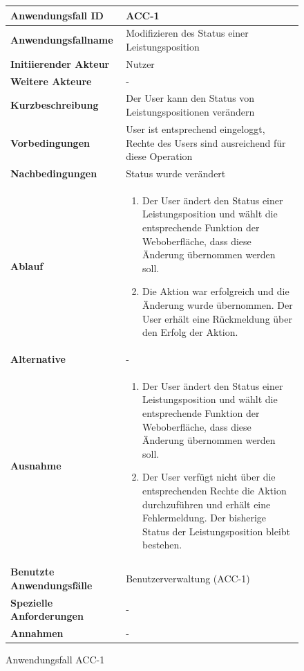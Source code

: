 \begin{figure}[h]
	\centering
	\begin{tabularx}{\textwidth}{ X | X }
		\textbf{Anwendungsfall ID} & ACC-1 \\ \hline
		\textbf{Anwendungsfallname} & Modifizieren des Status einer Leistungsposition \\ \hline
		\textbf{Initiierender Akteur} & Nutzer \\ \hline
		\textbf{Weitere Akteure} & -  \\ \hline
		\textbf{Kurzbeschreibung} & Der User kann den Status von Leistungspositionen ver\"andern \\ \hline
		\textbf{Vorbedingungen} & User ist entsprechend eingeloggt, Rechte des Users sind ausreichend f\"ur diese Operation \\ \hline
		\textbf{Nachbedingungen} & Status wurde ver\"andert \\ \hline
		\textbf{Ablauf} &
		\begin{enumerate}
			\item Der User \"andert den Status einer Leistungsposition und w\"ahlt die entsprechende Funktion der Weboberfl\"ache, dass diese \"Anderung \"ubernommen werden soll.
			\item Die Aktion war erfolgreich und die \"Anderung wurde \"ubernommen.  Der User erh\"alt eine R\"uckmeldung \"uber den Erfolg der Aktion.
		\end{enumerate} \\ \hline
		\textbf{Alternative} & -
		\\ \hline
		\textbf{Ausnahme} &
		\begin{enumerate}
			\item Der User \"andert den Status einer Leistungsposition und w\"ahlt die entsprechende Funktion der Weboberfl\"ache,  dass diese \"Anderung \"ubernommen werden soll.
			\item Der User verf\"ugt nicht \"uber die entsprechenden Rechte die Aktion durchzuf\"uhren und erh\"alt eine Fehlermeldung. Der bisherige Status der Leistungsposition bleibt bestehen.
		\end{enumerate}  \\ \hline
		\textbf{Benutzte Anwendungsfälle} & Benutzerverwaltung (ACC-1) \\ \hline
		\textbf{Spezielle Anforderungen} & - \\ \hline
		\textbf{Annahmen} & -
	\end{tabularx}
	\caption{Anwendungsfall ACC-1}
	\label{fig:anwendungsfall-server-tabelle-ACC-1}
\end{figure}

